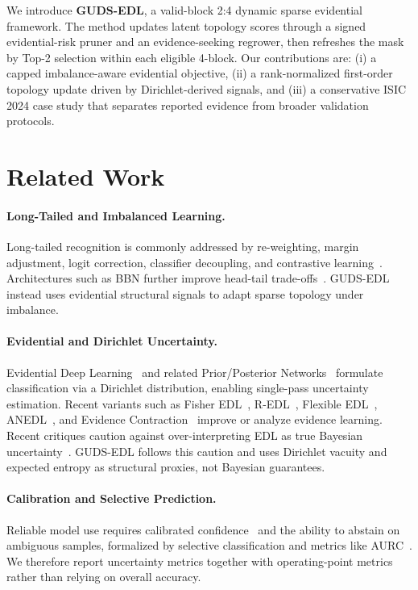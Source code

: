 \documentclass[letterpaper]{article} %
\begin{document}
We introduce \textbf{GUDS-EDL}, a valid-block 2:4 dynamic sparse evidential framework. The method updates latent topology scores through a signed evidential-risk pruner and an evidence-seeking regrower, then refreshes the mask by Top-2 selection within each eligible 4-block. Our contributions are: (i) a capped imbalance-aware evidential objective, (ii) a rank-normalized first-order topology update driven by Dirichlet-derived signals, and (iii) a conservative ISIC 2024 case study that separates reported evidence from broader validation protocols.

\section{Related Work}
\paragraph{Long-Tailed and Imbalanced Learning.} Long-tailed recognition is commonly addressed by re-weighting, margin adjustment, logit correction, classifier decoupling, and contrastive learning~\cite{cui2019class,cao2019learning,menon2021long,ren2020balanced,kang2019decoupling,cui2021parametric}. Architectures such as BBN further improve head-tail trade-offs~\cite{zhou2020bbn}. GUDS-EDL instead uses evidential structural signals to adapt sparse topology under imbalance.

\paragraph{Evidential and Dirichlet Uncertainty.} Evidential Deep Learning~\cite{sensoy2018evidential} and related Prior/Posterior Networks~\cite{malinin2018predictive} formulate classification via a Dirichlet distribution, enabling single-pass uncertainty estimation. Recent variants such as Fisher EDL~\cite{deng2023fisher}, R-EDL~\cite{chen2023redl}, Flexible EDL~\cite{yoon2025flexible}, ANEDL~\cite{yu2024anedl}, and Evidence Contraction~\cite{wu2024evidence} improve or analyze evidence learning. Recent critiques caution against over-interpreting EDL as true Bayesian uncertainty~\cite{shen2024mirage}. GUDS-EDL follows this caution and uses Dirichlet vacuity and expected entropy as structural proxies, not Bayesian guarantees.

\paragraph{Calibration and Selective Prediction.} Reliable model use requires calibrated confidence~\cite{guo2017calibration} and the ability to abstain on ambiguous samples, formalized by selective classification and metrics like AURC~\cite{geifman2017selective,geifman2019selectivenet,ding2020revisiting,traub2024overcoming}. We therefore report uncertainty metrics together with operating-point metrics rather than relying on overall accuracy.
\end{document}
